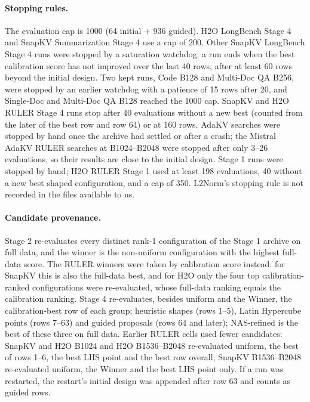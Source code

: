 \paragraph{Stopping rules.} The evaluation cap is 1000 (64 initial + 936 guided). H2O LongBench Stage 4 and SnapKV Summarization Stage 4 use a cap of 200. Other SnapKV LongBench Stage 4 runs were stopped by a saturation watchdog: a run ends when the best calibration score has not improved over the last 40 rows, after at least 60 rows beyond the initial design. Two kept runs, Code B128 and Multi-Doc QA B256, were stopped by an earlier watchdog with a patience of 15 rows after 20, and Single-Doc and Multi-Doc QA B128 reached the 1000 cap. SnapKV and H2O RULER Stage 4 runs stop after 40 evaluations without a new best (counted from the later of the best row and row 64) or at 160 rows. AdaKV searches were stopped by hand once the archive had settled or after a crash; the Mistral AdaKV RULER searches at B1024--B2048 were stopped after only 3--26 evaluations, so their results are close to the initial design. Stage 1 runs were stopped by hand; H2O RULER Stage 1 used at least 198 evaluations, 40 without a new best shaped configuration, and a cap of 350. L2Norm's stopping rule is not recorded in the files available to us.

\paragraph{Candidate provenance.} Stage 2 re-evaluates every distinct rank-1 configuration of the Stage 1 archive on full data, and the winner is the non-uniform configuration with the highest full-data score. The RULER winners were taken by calibration score instead: for SnapKV this is also the full-data best, and for H2O only the four top calibration-ranked configurations were re-evaluated, whose full-data ranking equals the calibration ranking. Stage 4 re-evaluates, besides uniform and the Winner, the calibration-best row of each group: heuristic shapes (rows 1--5), Latin Hypercube points (rows 7--63) and guided proposals (rows 64 and later); NAS-refined is the best of these three on full data. Earlier RULER cells used fewer candidates: SnapKV and H2O B1024 and H2O B1536--B2048 re-evaluated uniform, the best of rows 1--6, the best LHS point and the best row overall; SnapKV B1536--B2048 re-evaluated uniform, the Winner and the best LHS point only. If a run was restarted, the restart's initial design was appended after row 63 and counts as guided rows.

